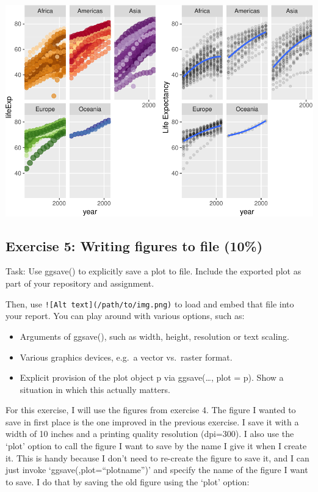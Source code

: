 \documentclass[]{article}
\providecommand{\tightlist}{%
  \setlength{\itemsep}{0pt}\setlength{\parskip}{0pt}}
\begin{document}
\includegraphics{hw05_files/figure-latex/unnamed-chunk-12-3.pdf}

\hypertarget{exercise-5-writing-figures-to-file-10}{%
\subsection{Exercise 5: Writing figures to file
(10\%)}\label{exercise-5-writing-figures-to-file-10}}

Task: Use ggsave() to explicitly save a plot to file. Include the
exported plot as part of your repository and assignment.

Then, use \texttt{!{[}Alt\ text{]}(/path/to/img.png)} to load and embed
that file into your report. You can play around with various options,
such as:

\begin{itemize}
\tightlist
\item
  Arguments of ggsave(), such as width, height, resolution or text
  scaling.
\item
  Various graphics devices, e.g.~a vector vs.~raster format.
\item
  Explicit provision of the plot object p via ggsave(\ldots{}, plot =
  p). Show a situation in which this actually matters.
\end{itemize}

For this exercise, I will use the figures from exercise 4. The figure I
wanted to save in first place is the one improved in the previous
exercise. I save it with a width of 10 inches and a printing quality
resolution (dpi=300). I also use the `plot' option to call the figure I
want to save by the name I give it when I create it. This is handy
because I don't need to re-create the figure to save it, and I can just
invoke `ggsave(,plot=``plotname'')' and specify the name of the figure I
want to save. I do that by saving the old figure using the `plot'
option:
\end{document}
